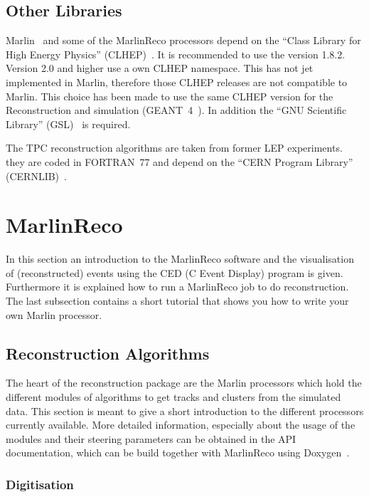 \subsection{Other Libraries} \label{sec:otherlibs}

Marlin~\cite{ref_marlin} and some of the MarlinReco processors depend on the
``Class Library for High Energy Physics'' (CLHEP)~\cite{ref_clhep}. 
It is recommended to use the version 1.8.2. Version 2.0 and higher use a 
own CLHEP namespace. This has not jet implemented in Marlin, therefore those
CLHEP releases are not compatible to Marlin. This choice has been 
made to use the same CLHEP version for the Reconstruction and simulation 
(GEANT~4~\cite{ref_geant4}). In addition the ``GNU Scientific Library'' 
(GSL)~\cite{ref_gsl} is required. 

The TPC reconstruction algorithms are taken from former LEP experiments.  
they are coded in FORTRAN~77 and depend on the ``CERN Program Library'' 
(CERNLIB)~\cite{ref_cernlib}. 

\section{MarlinReco}

In this section an introduction to the MarlinReco software and the
visualisation of (reconstructed) events using the 
CED (C Event Display) program is given. Furthermore it is explained how to 
run a MarlinReco job to do reconstruction. The last subsection 
contains a short tutorial that shows you how to write your own Marlin 
processor. 

\subsection{Reconstruction Algorithms}

The heart of the reconstruction package are the Marlin processors
which hold the different modules of algorithms to get tracks and 
clusters from the simulated data. This section is meant to give a short 
introduction to the different processors currently available. More detailed 
information, especially about the usage of the modules and their 
steering parameters can be obtained in the API documentation, which can be
build together with MarlinReco using Doxygen~\cite{ref_doxygen}. 

\subsubsection{Digitisation}


